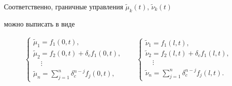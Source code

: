 Соответственно, граничные управления $\tilde{\mu}_k(t)$, $\tilde{\nu}_k(t)$

можно выписать в виде

\begin{equation}

\label{2:mu_nu_bE}

\begin{array}{cc}

\left\{

  \begin{array}{l}

    \tilde{\mu}_1={f_1(0,t)}, \\

    \tilde{\mu}_2={f_2(0,t)}+\delta_c {f_1(0,t)}, \\

    ~~~~~\vdots \\

    \tilde{\mu}_n=\sum_{j=1}^{n}{\delta_c^{n-j}{f_{j}(0,t)}},

  \end{array}

\right.

\quad &

\left\{

  \begin{array}{l}

    \tilde{\nu}_1={f_1(l,t)}, \\

    \tilde{\nu}_2={f_2(l,t)}+\delta_c {f_1(l,t)}, \\

    ~~~~\,\vdots \\

    \tilde{\nu}_n=\sum_{j=1}^{n}{\delta_c^{n-j}{f_{j}(l,t)}}.

  \end{array}

\right.

\end{array}

\end{equation}



%





